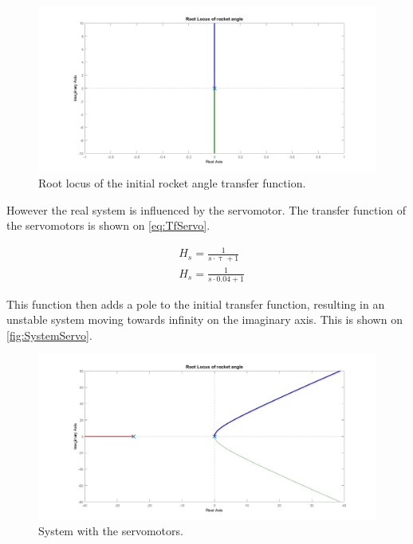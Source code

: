 \begin{figure}[htbp]
	\centering
	
		\includegraphics[width=\textwidth]{figures/Rocket/design/initial_transfer_function_vf}
		\caption{Root locus of the initial rocket angle transfer function.}
		\label{fig:Rinitialtf}
	
\end{figure}

However the real system is influenced by the servomotor. The transfer function of the servomotors is shown on \autoref{eq:TfServo}. 

\begin{subequations}
	\begin{flalign}
& H_s = \frac{1}{s \cdot \uptau + 1}	\\
& H_s = \frac{1}{s \cdot 0.04 + 1}
\label{eq:TfServo}
	\end{flalign}
\end{subequations}
\startexplain
{}
\stopexplain

This function then adds a pole to the initial transfer function, resulting in an unstable system moving towards infinity on the imaginary axis. This is shown on \autoref{fig:SystemServo}.
				
\begin{figure}[htbp]
	\centering
		\includegraphics[width=\textwidth]{figures/Rocket/design/tf_with_servo_vf}
		\caption{System with the servomotors.}
		\label{fig:SystemServo}
\end{figure}

